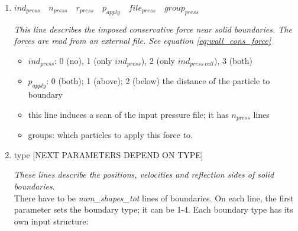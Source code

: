 \begin{enumerate}
\item $  ind_{press} \quad n_{press} \quad r_{press} \quad p_{apply} \quad file_{press} \quad group_{press} $

	{\em This line describes the imposed conservative force near solid boundaries. The forces are read from an external file. See equation \eqref{eq:wall_cons_force}}
	\begin{itemize}
	\item $ ind_{press}$: 0 (no), 1 (only $ ind_{press}$), 2 (only $ ind_{press\ cell}$), 3 (both)
	\item $ p_{apply}$: 0 (both); 1 (above); 2 (below) the distance of the particle to boundary
	\item this line induces a scan of the input pressure file; it has $ n_{press}$ lines
	\item groups: which particles to apply this force to.
	\end{itemize}

\item {type} [NEXT PARAMETERS DEPEND ON TYPE]

	{\em These lines describe the positions, velocities and reflection sides of solid boundaries}.\\
There have to be \textit{num\_shapes\_tot} lines of boundaries. On each line, the first parameter sets the boundary type; it can be 1-4. Each boundary type has its own input structure:


\end{enumerate}
